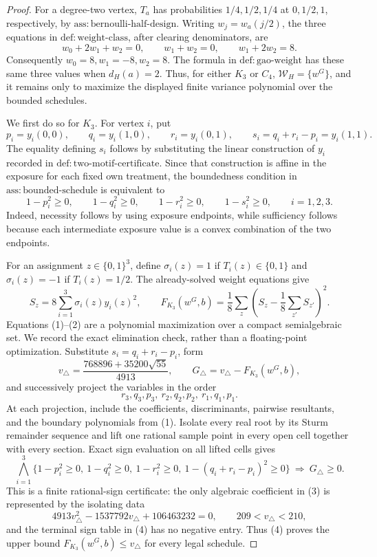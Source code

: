 \documentclass{article}
\begin{document}
\begin{proof}
For a degree-two vertex, \(T_a\) has probabilities \(1/4,1/2,1/4\) at \(0,1/2,1\), respectively, by \(\mathrm{ass:bernoulli\text{-}half\text{-}design}\).  Writing \(w_j=w_a(j/2)\), the three equations in \(\mathrm{def:weight\text{-}class}\), after clearing denominators, are
\[
w_0+2w_1+w_2=0,\qquad w_1+w_2=0,\qquad w_1+2w_2=8.
\]
Consequently \(w_0=8,w_1=-8,w_2=8\).  The formula in \(\mathrm{def:gao\text{-}weight}\) has these same three values when \(d_H(a)=2\).  Thus, for either \(K_3\) or \(C_4\), \(\mathcal W_H=\{w^G\}\), and it remains only to maximize the displayed finite variance polynomial over the bounded schedules.

We first do so for \(K_3\).  For vertex \(i\), put
\[
p_i=y_i(0,0),\qquad q_i=y_i(1,0),\qquad r_i=y_i(0,1),\qquad s_i=q_i+r_i-p_i=y_i(1,1).
\]
The equality defining \(s_i\) follows by substituting the linear construction of \(y_i\) recorded in \(\mathrm{def:two\text{-}motif\text{-}certificate}\).  Since that construction is affine in the exposure for each fixed own treatment, the boundedness condition in \(\mathrm{ass:bounded\text{-}schedule}\) is equivalent to
\[
1-p_i^2\ge0,\qquad 1-q_i^2\ge0,\qquad 1-r_i^2\ge0,\qquad 1-s_i^2\ge0,\qquad i=1,2,3. \tag{1}
\]
Indeed, necessity follows by using exposure endpoints, while sufficiency follows because each intermediate exposure value is a convex combination of the two endpoints.

For an assignment \(z\in\{0,1\}^3\), define \(\sigma_i(z)=1\) if \(T_i(z)\in\{0,1\}\) and \(\sigma_i(z)=-1\) if \(T_i(z)=1/2\).  The already-solved weight equations give
\[
S_z=8\sum_{i=1}^3\sigma_i(z)y_i(z)^2,\qquad
F_{K_3}(w^G,b)=\frac18\sum_z\left(S_z-\frac18\sum_{z'}S_{z'}\right)^2. \tag{2}
\]
Equations (1)--(2) are a polynomial maximization over a compact semialgebraic set.  We record the exact elimination check, rather than a floating-point optimization.  Substitute \(s_i=q_i+r_i-p_i\), form
\[
v_\triangle=\frac{768896+35200\sqrt{55}}{4913},\qquad
G_\triangle=v_\triangle-F_{K_3}(w^G,b), \tag{3}
\]
and successively project the variables in the order
\[
r_3,q_3,p_3,\ r_2,q_2,p_2,\ r_1,q_1,p_1.
\]
At each projection, include the coefficients, discriminants, pairwise resultants, and the boundary polynomials from (1).  Isolate every real root by its Sturm remainder sequence and lift one rational sample point in every open cell together with every section.  Exact sign evaluation on all lifted cells gives
\[
\bigwedge_{i=1}^3\{1-p_i^2\ge0,\ 1-q_i^2\ge0,\ 1-r_i^2\ge0,\ 1-(q_i+r_i-p_i)^2\ge0\}\ \Longrightarrow\ G_\triangle\ge0. \tag{4}
\]
This is a finite rational-sign certificate: the only algebraic coefficient in (3) is represented by the isolating data
\[
4913v_\triangle^2-1537792v_\triangle+106463232=0,\qquad 209<v_\triangle<210, \tag{5}
\]
and the terminal sign table in (4) has no negative entry.  Thus (4) proves the upper bound \(F_{K_3}(w^G,b)\le v_\triangle\) for every legal schedule.


\end{proof}
\end{document}
